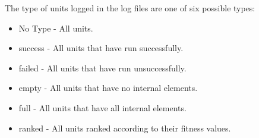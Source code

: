 The type of units logged in the log files are one of six possible types:

\begin{itemize}
	\item No Type - All units.
	\item success - All units that have run successfully.
	\item failed - All units that have run unsuccessfully.
	\item empty - All units that have no internal elements.
	\item full - All units that have all internal elements.
	\item ranked - All units ranked according to their fitness values.
\end{itemize}